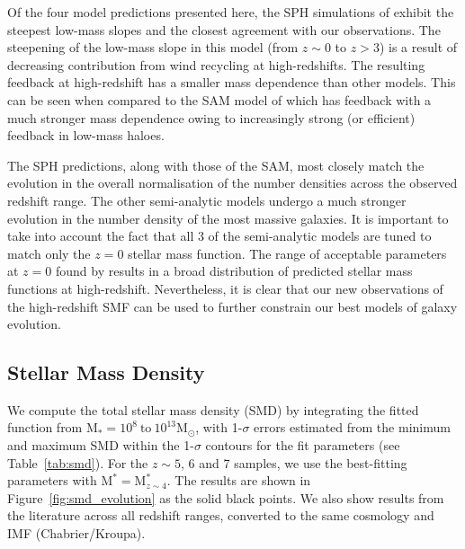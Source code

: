 Of the four model predictions presented here, the SPH simulations of \citet{Dave:2013bf} exhibit the steepest low-mass slopes and the closest agreement with our observations. The steepening of the low-mass slope in this model (from $z \sim 0$ to $z > 3$) is a result of decreasing contribution from wind recycling at high-redshifts. The resulting feedback at high-redshift has a smaller mass dependence than other models. This can be seen when compared to the SAM model of \citet{Lu:2011hj} which has feedback with a much stronger mass dependence owing to increasingly strong (or efficient) feedback in low-mass haloes. 

The SPH predictions, along with those of the \citet{Lu:2011hj} SAM, most closely match the evolution in the overall normalisation of the number densities across the observed redshift range. The other semi-analytic models undergo a much stronger evolution in the number density of the most massive galaxies. It is important to take into account the fact that all 3 of the semi-analytic models are tuned to match only the $z = 0$ stellar mass function. The range of acceptable parameters at $z = 0$ found by \citet{Lu:2011hj} results in a broad distribution of predicted stellar mass functions at high-redshift. Nevertheless, it is clear that our new observations of the high-redshift SMF can be used to further constrain our best models of galaxy evolution.

\subsection{Stellar Mass Density}
We compute the total stellar mass density (SMD) by integrating the fitted \citet{Schechter:1976gl} function from $\text{M}_{*} = 10^8~\text{to}~10^{13} \text{M}_{\odot}$, with 1-$\sigma$ errors estimated from the minimum and maximum SMD within the 1-$\sigma$ contours for the fit parameters (see Table~\ref{tab:smd}). For the $z\sim 5$, 6 and 7 samples, we use the best-fitting parameters with $\text{M}^{*} = \text{M}_{z\sim4}^{*}$. The results are shown in Figure~\ref{fig:smd_evolution} as the solid black points. We also show results from the literature across all redshift ranges, converted to the same cosmology and IMF (Chabrier/Kroupa).

